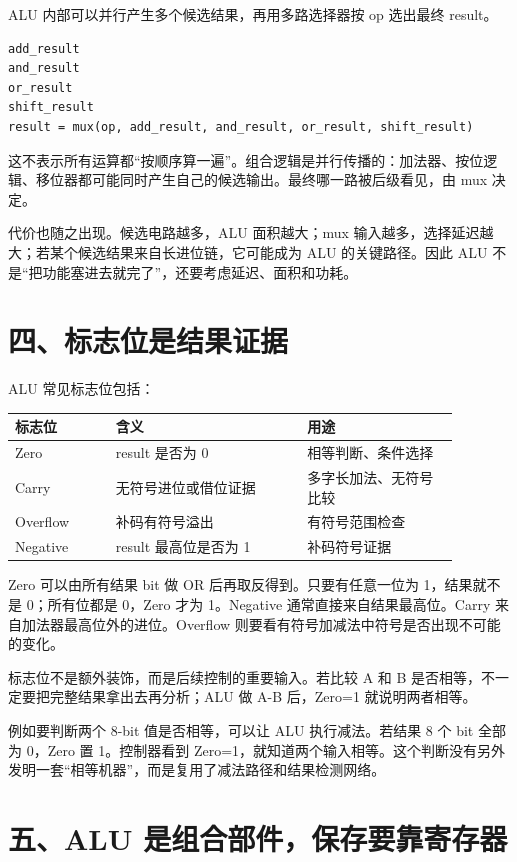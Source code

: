 ALU 内部可以并行产生多个候选结果，再用多路选择器按 op 选出最终 result。

\begin{lstlisting}
add_result
and_result
or_result
shift_result
result = mux(op, add_result, and_result, or_result, shift_result)
\end{lstlisting}

这不表示所有运算都“按顺序算一遍”。组合逻辑是并行传播的：加法器、按位逻辑、移位器都可能同时产生自己的候选输出。最终哪一路被后级看见，由 mux 决定。

代价也随之出现。候选电路越多，ALU 面积越大；mux 输入越多，选择延迟越大；若某个候选结果来自长进位链，它可能成为 ALU 的关键路径。因此 ALU 不是“把功能塞进去就完了”，还要考虑延迟、面积和功耗。

\section{四、标志位是结果证据}

ALU 常见标志位包括：

\begin{longtable}{p{0.2\linewidth}p{0.38\linewidth}p{0.3\linewidth}}
\toprule
标志位 & 含义 & 用途 \\
\midrule
Zero & result 是否为 0 & 相等判断、条件选择 \\
Carry & 无符号进位或借位证据 & 多字长加法、无符号比较 \\
Overflow & 补码有符号溢出 & 有符号范围检查 \\
Negative & result 最高位是否为 1 & 补码符号证据 \\
\bottomrule
\end{longtable}

Zero 可以由所有结果 bit 做 OR 后再取反得到。只要有任意一位为 1，结果就不是 0；所有位都是 0，Zero 才为 1。Negative 通常直接来自结果最高位。Carry 来自加法器最高位外的进位。Overflow 则要看有符号加减法中符号是否出现不可能的变化。

标志位不是额外装饰，而是后续控制的重要输入。若比较 A 和 B 是否相等，不一定要把完整结果拿出去再分析；ALU 做 A-B 后，Zero=1 就说明两者相等。

例如要判断两个 8-bit 值是否相等，可以让 ALU 执行减法。若结果 8 个 bit 全部为 0，Zero 置 1。控制器看到 Zero=1，就知道两个输入相等。这个判断没有另外发明一套“相等机器”，而是复用了减法路径和结果检测网络。

\section{五、ALU 是组合部件，保存要靠寄存器}

